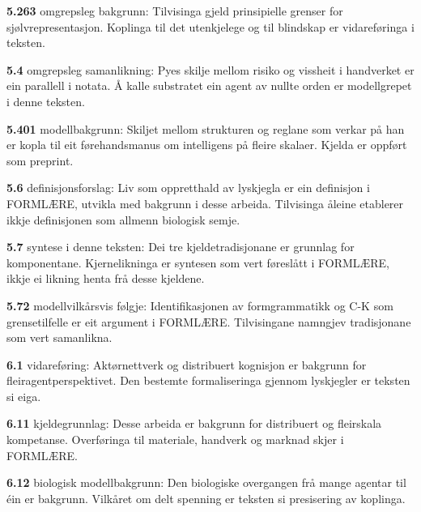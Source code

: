 \begin{widebody}
\noindent\hypertarget{kjeldenotat-5.263}{}\textbf{5.263} omgrepsleg bakgrunn: Tilvisinga gjeld prinsipielle grenser for sjølvrepresentasjon. Koplinga til det utenkjelege og til blindskap er vidareføringa i teksten.\par\medskip
\noindent\hypertarget{kjeldenotat-5.4}{}\textbf{5.4} omgrepsleg samanlikning: Pyes skilje mellom risiko og vissheit i handverket er ein parallell i notata. Å kalle substratet ein agent av nullte orden er modellgrepet i denne teksten.\par\medskip
\noindent\hypertarget{kjeldenotat-5.401}{}\textbf{5.401} modellbakgrunn: Skiljet mellom strukturen og reglane som verkar på han er kopla til eit førehandsmanus om intelligens på fleire skalaer. Kjelda er oppført som preprint.\par\medskip
\noindent\hypertarget{kjeldenotat-5.6}{}\textbf{5.6} definisjonsforslag: Liv som oppretthald av lyskjegla er ein definisjon i FORMLÆRE, utvikla med bakgrunn i desse arbeida. Tilvisinga åleine etablerer ikkje definisjonen som allmenn biologisk semje.\par\medskip
\noindent\hypertarget{kjeldenotat-5.7}{}\textbf{5.7} syntese i denne teksten: Dei tre kjeldetradisjonane er grunnlag for komponentane. Kjernelikninga er syntesen som vert føreslått i FORMLÆRE, ikkje ei likning henta frå desse kjeldene.\par\medskip
\noindent\hypertarget{kjeldenotat-5.72}{}\textbf{5.72} modellvilkårsvis følgje: Identifikasjonen av formgrammatikk og C-K som grensetilfelle er eit argument i FORMLÆRE. Tilvisingane namngjev tradisjonane som vert samanlikna.\par\medskip
\noindent\hypertarget{kjeldenotat-6.1}{}\textbf{6.1} vidareføring: Aktørnettverk og distribuert kognisjon er bakgrunn for fleiragentperspektivet. Den bestemte formaliseringa gjennom lyskjegler er teksten si eiga.\par\medskip
\noindent\hypertarget{kjeldenotat-6.11}{}\textbf{6.11} kjeldegrunnlag: Desse arbeida er bakgrunn for distribuert og fleirskala kompetanse. Overføringa til materiale, handverk og marknad skjer i FORMLÆRE.\par\medskip
\noindent\hypertarget{kjeldenotat-6.12}{}\textbf{6.12} biologisk modellbakgrunn: Den biologiske overgangen frå mange agentar til éin er bakgrunn. Vilkåret om delt spenning er teksten si presisering av koplinga.\par\medskip

\end{widebody}
